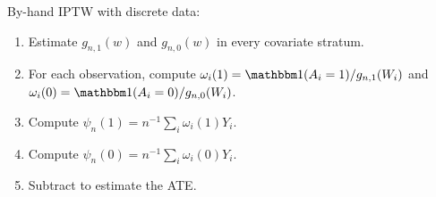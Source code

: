 \begin{estimationbox}
By-hand IPTW with discrete data:
\begin{enumerate}
\item Estimate $g_{n,1}(w)$ and $g_{n,0}(w)$ in every covariate stratum.
\item For each observation, compute $\omega_i(1)=\ind(A_i=1)/g_{n,1}(W_i)$ and
$\omega_i(0)=\ind(A_i=0)/g_{n,0}(W_i)$.
\item Compute $\psi_n(1)=n^{-1}\sum_i \omega_i(1)Y_i$.
\item Compute $\psi_n(0)=n^{-1}\sum_i \omega_i(0)Y_i$.
\item Subtract to estimate the ATE.
\end{enumerate}
\end{estimationbox}
